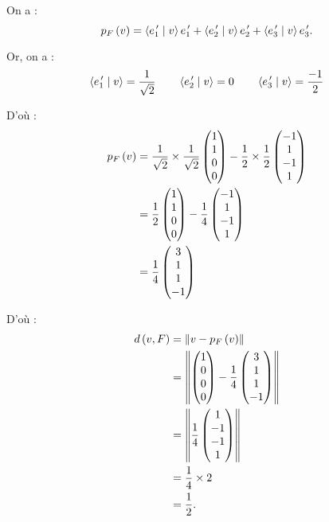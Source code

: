 \begin{corr}[2]
On a : \[p_F\left(v\right)=\left\langle e_1^{\,\prime}\;\middle|\; v\right\rangle e_1^{\,\prime}+\left\langle e_2^{\,\prime}\;\middle|\; v\right\rangle e_2^{\,\prime}+\left\langle e_3^{\,\prime}\;\middle|\; v\right\rangle e_3^{\,\prime}.\]

Or, on a : \[\left\langle e_1^{\,\prime}\;\middle|\; v\right\rangle=\dfrac{1}{\sqrt{2}}\qquad\left\langle e_2^{\,\prime}\;\middle|\; v\right\rangle=0\qquad\left\langle e_3^{\,\prime}\;\middle|\; v\right\rangle=\dfrac{-1}{2}\]

D'où : \[\begin{aligned}
p_F\left(v\right)&=\dfrac{1}{\sqrt{2}}\times\dfrac{1}{\sqrt{2}}\begin{pmatrix}
1 \\ 1 \\ 0 \\ 0
\end{pmatrix}-\dfrac{1}{2}\times\dfrac{1}{2}\begin{pmatrix}
-1 \\ 1 \\ -1 \\ 1
\end{pmatrix} \\
&=\dfrac{1}{2}\begin{pmatrix}
1 \\ 1 \\ 0 \\ 0
\end{pmatrix}-\dfrac{1}{4}\begin{pmatrix}
-1 \\ 1 \\ -1 \\ 1
\end{pmatrix} \\
&=\dfrac{1}{4}\begin{pmatrix}
3 \\ 1 \\ 1 \\ -1
\end{pmatrix}
\end{aligned}\]

D'où : \[\begin{aligned}
d\left(v,F\right)&=\left\|v-p_F\left(v\right)\right\| \\
&=\left\|\begin{pmatrix}
1 \\ 0 \\ 0 \\ 0
\end{pmatrix}-\dfrac{1}{4}\begin{pmatrix}
3 \\ 1 \\ 1 \\ -1
\end{pmatrix}\right\| \\
&=\left\|\dfrac{1}{4}\begin{pmatrix}
1 \\ -1 \\ -1 \\ 1
\end{pmatrix}\right\| \\
&=\dfrac{1}{4}\times2 \\
&=\dfrac{1}{2}.
\end{aligned}\]
\end{corr}

